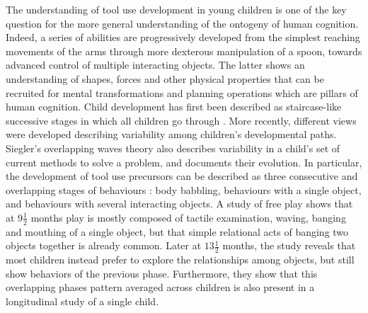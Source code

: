 \documentclass[10pt,letterpaper]{article}
\begin{document}
	
	The understanding of tool use development in young children is one of the key question for the more general understanding of the ontogeny of human cognition.
	Indeed, a series of abilities are progressively developed from the simplest reaching movements of the arms through more dexterous manipulation of a spoon, towards advanced control of multiple interacting objects.
	The latter shows an understanding of shapes, forces and other physical properties that can be recruited for mental transformations and planning operations which are pillars of human cognition.
	Child development has first been described as staircase-like successive stages in which all children go through \cite{piaget1952origins}.
	More recently, different views were developed describing variability among children's developmental paths. 
	Siegler's overlapping waves theory \cite{siegler1996emerging} also describes variability in a child's set of current methods to solve a problem, and documents their evolution. 
	In particular, the development of tool use precursors can be described as three consecutive and overlapping stages of behaviours \cite{guerin2013survey}: 
	body babbling, behaviours with a single object, and behaviours with several interacting objects.
	A study of free play \cite{Zelazo198095} shows that at $9\frac{1}{2}$ months play is mostly composed of tactile examination, waving, banging and mouthing of a single object, 
	but that simple relational acts of banging two objects together is already common.
	Later at $13\frac{1}{2}$ months, the study reveals that most children instead prefer to explore the relationships
	among objects, but still show behaviors of the previous phase. 
	Furthermore, they show that this overlapping phases pattern averaged across children is also present in a longitudinal study of a single child.
	
\end{document}
